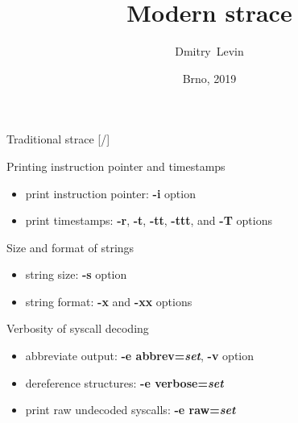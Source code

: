 \documentclass[unicode,aspectratio=169]{beamer}
\title{\Huge Modern strace}
\author{\Huge Dmitry~Levin}
\date{\Large Brno, 2019}
\begin{document}
\begin{frame}
\titlepage
\end{frame}

\begin{frame}{Traditional strace \hfill [\insertframenumber/\inserttotalframenumber]}
\large
\begin{block}{Printing instruction pointer and timestamps}
\begin{itemize}
\item print instruction pointer: \textbf{-i} option
\item print timestamps: \textbf{-r}, \textbf{-t}, \textbf{-tt}, \textbf{-ttt}, and \textbf{-T} options
\end{itemize}
\end{block}

\begin{block}{Size and format of strings}
\begin{itemize}
\item string size: \textbf{-s} option
\item string format: \textbf{-x} and \textbf{-xx} options
\end{itemize}
\end{block}

\begin{block}{Verbosity of syscall decoding}
\begin{itemize}
\item abbreviate output: \textbf{-e abbrev=\textit{set}}, \textbf{-v} option
\item dereference structures: \textbf{-e verbose=\textit{set}}
\item print raw undecoded syscalls: \textbf{-e raw=\textit{set}}
\end{itemize}
\end{block}
\end{frame}
\end{document}
